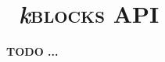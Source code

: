 \documentclass[onecolumn,a4paper,10pt]{IEEEtran}
\newcommand*{\kblocks}{\relax~\textit{k}\textsc{blocks}}
\newcommand*{\spacetweak}{\medskip\medskip}
\newenvironment{apilist}{
	\vspace{1ex}}%
{\vspace{1em}}
\newcommand{\cvhd}[1]{{
		{\subsection{#1}}{\mbox{}\break}\vspace{-5ex}
}}
\begin{document}
\section{\kblocks{} API}
\bfseries TODO ...
%
%
%
%
%	
%
%
%
%
%
%
%
%
%
%
%
%
%
\spacetweak\spacetweak
\end{document}
